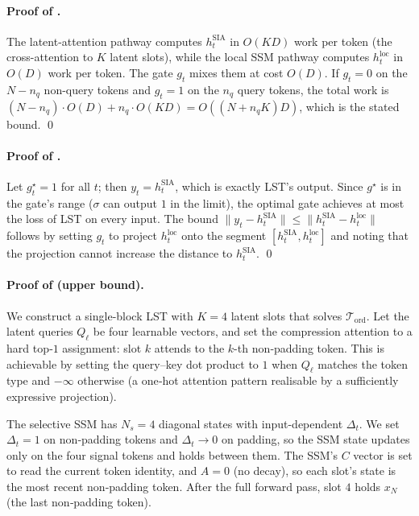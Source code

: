 \documentclass[10pt,twocolumn,letterpaper]{article}
\newcommand{\LST}{\textsc{LST}}
\begin{document}
\paragraph{Proof of .}
The latent-attention pathway computes $h^{\text{SIA}}_t$ in $O(KD)$ work
per token (the cross-attention to $K$ latent slots), while the local SSM
pathway computes $h^{\text{loc}}_t$ in $O(D)$ work per token.  The gate
$g_t$ mixes them at cost $O(D)$.  If $g_t\!=\!0$ on the $N\!-\!n_q$
non-query tokens and $g_t\!=\!1$ on the $n_q$ query tokens, the total
work is
$(N\!-\!n_q)\cdot O(D) + n_q\cdot O(KD) = O((N + n_q K)D)$,
which is the stated bound.  \qed

\paragraph{Proof of .}
Let $g^\star_t\!=\!1$ for all $t$; then $y_t\!=\!h^{\text{SIA}}_t$, which
is exactly \LST{}'s output.  Since $g^\star$ is in the gate's range
($\sigma$ can output $1$ in the limit), the optimal gate achieves at
most the loss of \LST{} on every input.  The bound
$\|y_t - h^{\text{SIA}}_t\|\leq\|h^{\text{SIA}}_t - h^{\text{loc}}_t\|$
follows by setting $g_t$ to project $h^{\text{loc}}_t$ onto the segment
$[h^{\text{SIA}}_t, h^{\text{loc}}_t]$ and noting that the projection
cannot increase the distance to $h^{\text{SIA}}_t$.  \qed

\paragraph{Proof of  (upper bound).}
We construct a single-block \LST{} with $K\!=\!4$ latent slots that solves
$\mathcal{T}_{\mathrm{ord}}$.  Let the latent queries $Q_\ell$ be four
learnable vectors, and set the compression attention to a hard top‑$1$
assignment: slot $k$ attends to the $k$-th non‑padding token.  This is
achievable by setting the query–key dot product to $1$ when $Q_\ell$
matches the token type and $-\infty$ otherwise (a one‑hot attention
pattern realisable by a sufficiently expressive projection).

The selective SSM has $N_s\!=\!4$ diagonal states with input-dependent
$\Delta_t$.  We set $\Delta_t\!=\!1$ on non‑padding tokens and
$\Delta_t\!\to\!0$ on padding, so the SSM state updates only on the four
signal tokens and holds between them.  The SSM's $C$ vector is set to
read the current token identity, and $A\!=\!0$ (no decay), so each slot's
state is the most recent non‑padding token.  After the full forward pass,
slot $4$ holds $x_N$ (the last non‑padding token).
\end{document}

